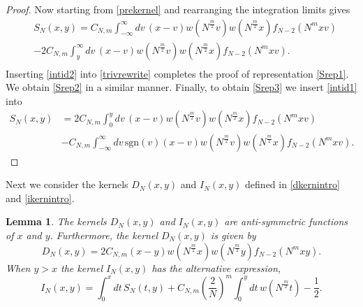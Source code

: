 \documentclass[11pt,reqno]{amsproc}
\newtheorem{lemma}[theorem]{Lemma}
\numberwithin{equation}{section}
\numberwithin{theorem}{section}
\begin{document}
\begin{proof}
Now starting from \eqref{prekernel} and rearranging the integration limits gives
\begin{equation}
\begin{split}
&S_{N}(x,y) = C_{N,m}\int_{-\infty}^{\infty}dv\,(x-v)w(N^{\frac{m}{2}}v)w(N^{\frac{m}{2}}x)f_{N-2}(N^{m}xv)\\
& - 2C_{N,m}\int_{y}^{\infty}dv\,(x-v)w(N^{\frac{m}{2}}v)w(N^{\frac{m}{2}}x)f_{N-2}(N^{m}xv). \label{trivrewrite}\\
\end{split}
\end{equation}
Inserting \eqref{intid2} into \eqref{trivrewrite} completes the proof of representation \eqref{Srep1}. 
We obtain \eqref{Srep2} in a similar manner. Finally, to obtain \eqref{Srep3} we insert \eqref{intid1} into
\begin{equation}
\begin{split}
S_{N}(x,y) &= 2C_{N,m}\int_{0}^{y}dv\, (x-v)w(N^{\frac{m}{2}}v)w(N^{\frac{m}{2}}x)f_{N-2}(N^{m}xv)\\
&-C_{N,m}\int_{-\infty}^{\infty}dv\,\mathrm{sgn}(v)(x-v)w(N^{\frac{m}{2}}v)w(N^{\frac{m}{2}}x)f_{N-2}(N^{m}xv).
\end{split}
\end{equation}
\end{proof}
Next we consider the kernels $D_{N}(x,y)$ and $I_{N}(x,y)$ defined in \eqref{dkernintro} and \eqref{ikernintro}. 
\begin{lemma}
\label{lem:dandi}
The kernels $D_{N}(x,y)$ and $I_{N}(x,y)$ are anti-symmetric functions of $x$ and $y$. Furthermore, the kernel $D_{N}(x,y)$ is given by
\begin{equation}
D_{N}(x,y) = 2C_{N,m}(x-y)w(N^{\frac{m}{2}}x)w(N^{\frac{m}{2}}y)f_{N-2}(N^{m}xy). \label{drep2}
\end{equation}
When $y>x$ the kernel $I_{N}(x,y)$ has the alternative expression,
\begin{equation}
I_{N}(x,y) = \int_{0}^{x}dt\,S_{N}(t,y)+C_{N,m}\left(\frac{2}{N}\right)^{m}\int_{0}^{y}dt\,w(N^{\frac{m}{2}}t)-\frac{1}{2}. \label{irep2}
\end{equation}
\end{lemma}
\end{document}
